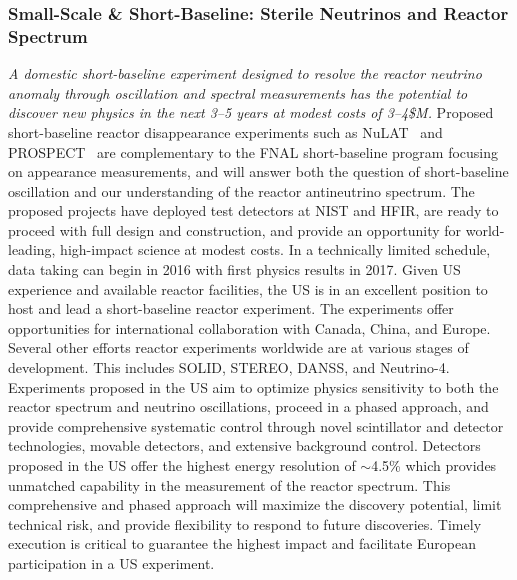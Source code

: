 \subsubsection{Small-Scale \& Short-Baseline: Sterile Neutrinos and Reactor Spectrum}
{\em A domestic short-baseline experiment designed to resolve the
reactor neutrino anomaly through oscillation and spectral measurements
has the potential to discover new physics in the next 3--5 years at
modest costs of 3--4\$M.}  Proposed short-baseline reactor
disappearance experiments such as NuLAT~\cite{Lane:2015alq} and
PROSPECT~\cite{Ashenfelter:2013oaa} are complementary to the FNAL
short-baseline program focusing on appearance measurements, and will
answer both the question of short-baseline oscillation and our
understanding of the reactor antineutrino spectrum. The proposed
projects have deployed test detectors at NIST and HFIR, are ready to
proceed with full design and construction, and provide an opportunity
for world-leading, high-impact science at modest costs. In a
technically limited schedule, data taking can begin in 2016 with first
physics results in 2017. Given US experience and available reactor
facilities, the US is in an excellent position to host and lead a
short-baseline reactor experiment. The experiments offer opportunities
for international collaboration with Canada, China, and Europe.
Several other efforts reactor experiments worldwide are at various
stages of development. This includes SOLID, STEREO, DANSS, and
Neutrino-4. Experiments proposed in the US aim to optimize physics
sensitivity to both the reactor spectrum and neutrino oscillations,
proceed in a phased approach, and provide comprehensive systematic
control through novel scintillator and detector technologies, movable
detectors, and extensive background control. Detectors proposed in the
US offer the highest energy resolution of $\sim$4.5\% which provides
unmatched capability in the measurement of the reactor spectrum. This
comprehensive and phased approach will maximize the discovery
potential, limit technical risk, and provide flexibility to respond to
future discoveries.  Timely execution is critical to guarantee the
highest impact and facilitate European participation in a US
experiment.

